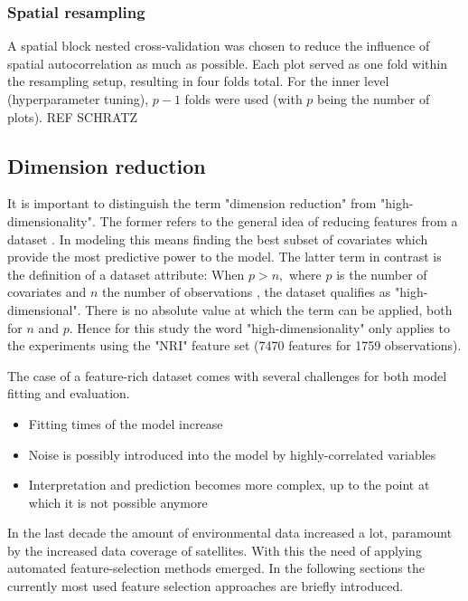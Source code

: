 \documentclass[review]{elsarticle}
\begin{document}
\subsubsection{Spatial resampling}


\noindent A spatial block nested cross-validation was chosen to reduce the influence of spatial autocorrelation as much as possible.
Each plot served as one fold within the resampling setup, resulting in four folds total.
For the inner level (hyperparameter tuning), $p - 1$ folds were used (with $p$ being the number of plots). REF SCHRATZ

\subsection{Dimension reduction}

\noindent It is important to distinguish the term "dimension reduction" from "high-dimensionality".
The former refers to the general idea of reducing features from a dataset \citep{vandermaaten2007}.
In modeling this means finding the best subset of covariates which provide the most predictive power to the model.
The latter term in contrast is the definition of a dataset attribute:
When $p > n,$ where $p$ is the number of covariates and $n$ the number of observations \citep{hastie2001}, the dataset qualifies as "high-dimensional".
There is no absolute value at which the term can be applied, both for $n$ and $p$.
Hence for this study the word "high-dimensionality" only applies to the experiments using the "NRI" feature set (7470 features for 1759 observations).

The case of a feature-rich dataset comes with several challenges for both model fitting and evaluation.

\begin{itemize}
	\item Fitting times of the model increase
	\item Noise is possibly introduced into the model by highly-correlated variables \citep{johnstoneiainm.2009}
	\item Interpretation and prediction becomes more complex, up to the point at which it is not possible anymore \citep{johnstoneiainm.2009}
\end{itemize}

\noindent In the last decade the amount of environmental data increased a lot, paramount by the increased data coverage of satellites.
With this the need of applying automated feature-selection methods emerged.
In the following sections the currently most used feature selection approaches are briefly introduced.
\end{document}
